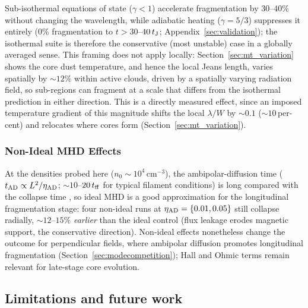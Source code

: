 \documentclass[usenatbib,twoside,twocolumn]{mnras}
\begin{document}
Sub-isothermal equations of state ($\gamma<1$) accelerate fragmentation by $30$--$40\%$ without changing the wavelength, while adiabatic heating ($\gamma=5/3$) suppresses it entirely (0\% fragmentation to $t>30$--$40\,t_{\rm J}$; Appendix~\ref{sec:validation}); the isothermal suite is therefore the conservative (most unstable) case in a globally averaged sense. This framing does not apply locally: Section~\ref{sec:mt_variation} shows the core dust temperature, and hence the local Jeans length, varies spatially by $\sim12\%$ within active clouds, driven by a spatially varying radiation field, so sub-regions can fragment at a scale that differs from the isothermal prediction in either direction. This is a directly measured effect, since an imposed temperature gradient of this magnitude shifts the local $\lambda/W$ by $\sim0.1$ ($\sim10$\,per-cent) and relocates where cores form (Section~\ref{sec:mt_variation}).

\subsubsection{Non-Ideal MHD Effects}
\label{sec:nonideal}

At the densities probed here ($n_0\sim10^4$\,cm$^{-3}$), the ambipolar-diffusion time ($t_{\rm AD}\propto L^2/\eta_{\rm AD}$; $\sim10$--$20\,t_{\rm ff}$ for typical filament conditions) is long compared with the collapse time \citep{Tassis2004}, so ideal MHD is a good approximation for the longitudinal fragmentation stage: four non-ideal runs at $\eta_{\rm AD}=\{0.01,0.05\}$ still collapse radially, $\sim12$--$15\%$ \textit{earlier} than the ideal control (flux leakage erodes magnetic support, the conservative direction). Non-ideal effects nonetheless change the outcome for perpendicular fields, where ambipolar diffusion promotes longitudinal fragmentation (Section~\ref{sec:modecompetition}); Hall and Ohmic terms remain relevant for late-stage core evolution.

\subsection{Limitations and future work}
\label{sec:limitations}
\end{document}
